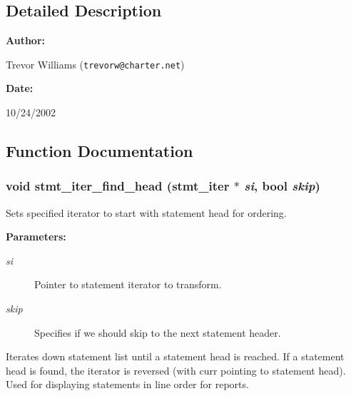 \subsection{Detailed Description}


\begin{Desc}
\item[{\bf Author: }]\par
Trevor Williams ({\tt trevorw@charter.net}) \end{Desc}
\begin{Desc}
\item[{\bf Date: }]\par
10/24/2002

\end{Desc}


\subsection{Function Documentation}
\subsubsection{\setlength{\rightskip}{0pt plus 5cm}void stmt\_\-iter\_\-find\_\-head ({\bf stmt\_\-iter} $\ast$ {\em si}, {\bf bool} {\em skip})}\label{iter_8c_a3}


Sets specified iterator to start with statement head for ordering.

\begin{Desc}
\item[{\bf Parameters: }]\par
\begin{description}
\item[
{\em si}]Pointer to statement iterator to transform. \item[
{\em skip}]Specifies if we should skip to the next statement header.

\end{description}
\end{Desc}
Iterates down statement list until a statement head is reached. If a statement head is found, the iterator is reversed (with curr pointing to statement head). Used for displaying statements in line order for reports. 
